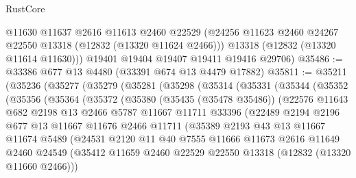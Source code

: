 \begin{lexlean}{RustCore}
\begin{coremodule}
        @11630
        @11637
        @2616
        @11613
        @2460
        @22529
        (@24256 @11623 @2460 @24267 @22550 @13318 (@12832 (@13320 @11624 @2466)))
        @13318
        (@12832 (@13320 @11614 @11630)))
      @19401
      @19404
      @19407
      @19411
      @19416
      @29706)
@35486 := @33386 @677 @13 @4480 (@33391 @674 @13 @4479 @17882)
@35811 := @35211
    (@35236
      (@35277
        (@35279
          (@35281
            (@35298
              (@35314
                (@35331
                  (@35344
                    (@35352
                      (@35356
                        (@35364
                          (@35372
                            (@35380
                              (@35435 (@35478 @35486))
                              (@22576
                                @11643
                                @682
                                @2198
                                @13
                                @2466
                                @5787
                                @11667
                                @11711
                                @33396
                                (@22489
                                  @2194
                                  @2196
                                  @677
                                  @13
                                  @11667
                                  @11676
                                  @2466
                                  @11711
                                  (@35389
                                    @2193
                                    @43
                                    @13
                                    @11667
                                    @11674
                                    @5489
                                    (@24531
                                      @2120
                                      @11
                                      @40
                                      @7555
                                      @11666
                                      @11673
                                      @2616
                                      @11649
                                      @2460
                                      @24549
                                      (@35412
                                        @11659
                                        @2460
                                        @22529
                                        @22550
                                        @13318
                                        (@12832 (@13320 @11660 @2466)))

\end{coremodule}
\end{lexlean}
